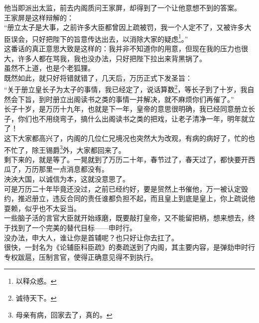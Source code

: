 \begin{multicols}{\theparacolNo}
他当即派出太监，前去内阁质问王家屏，却得到了一个让他意想不到的答案。\\

王家屏是这样辩解的：\\

“册立太子是大事，之前许多大臣都曾因上疏被罚，我一个人定不了，又被许多大臣误会，只好把陛下的旨意传达出去，以消除大家的疑虑\footnote{以释众惑。}。”\\

这番话的真正意思大致是这样的：我并非不知道你的用意，但现在我的压力也很大，许多人都在骂我，我也没办法，只好把陛下拉出来背黑锅了。\\

虽然不上道，也是个老狐狸。\\

既然如此，就只好将错就错了，几天后，万历正式下发圣旨：\\

“关于册立皇长子为太子的事情，我已经定了，说话算数\footnote{诚待天下。}，等长子到了十岁，我自然会下旨，到时册立出阁读书之类的事情一并解决，就不麻烦你们再催了。”\\

长子十岁，是万历十九年，也就是下一年，皇帝的意思很明确，我已经同意册立长子，你们也不用绕弯子，搞什么出阁读书之类的把戏，让老子清净一年，明年就立了！\\

这下大家都高兴了，内阁的几位仁兄境况也突然大为改观，有病的病好了，忙的也不忙了，除王锡爵\footnote{母亲有病，回家去了，真的。}外，大家都回来了。\\

剩下来的，就是等了。一晃就到了万历二十年，春节过了，春天过了，都快要开西瓜了，万历那里一点消息都没有。\\

泱泱大国，以诚信为本，这就没意思了。\\

可是万历二十年毕竟还没过，之前已经约好，要是贸然上书催他，万一被认定毁约，推迟册立，违反合同的责任谁都负担不起，而且皇上到底是皇上，你上疏说他耍赖，似乎也不太妥当。\\

一些脑子活的言官大臣就开始琢磨，既要敲打皇帝，又不能留把柄，想来想去，终于找到了一个完美的替代目标——申时行。\\

没办法，申大人，谁让你是首辅呢？也只好让你去扛了。\\

很快，一封名为《论辅臣科臣疏》的奏疏送到了内阁，其主要内容，是弹劾申时行专权跋扈，压制言官，使得正确意见得不到执行。\\


\end{multicols}
